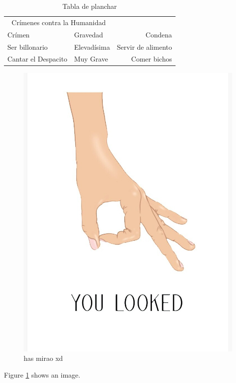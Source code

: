 \documentclass[twoside,twocolumn]{article}
\begin{document}
\begin{table}[bp]
\caption{Tabla de planchar}
\centering
\begin{tabular}{llr}
\toprule
\multicolumn{2}{c}{Crímenes contra la Humanidad} \\
\cmidrule(r){1-2}
Crímen & Gravedad & Condena \\
\midrule
Ser billonario & Elevadísima & Servir de alimento \\
Cantar el Despacito & Muy Grave & Comer bichos \\
\bottomrule
\end{tabular}
\end{table}

\begin{figure}[h!]
	\includegraphics[width=\linewidth]{images/hasmirao.jpg}
	\caption{has mirao xd}
	\label{fig:fig01}
\end{figure}

Figure \ref{fig:fig01} shows an image.
\end{document}
